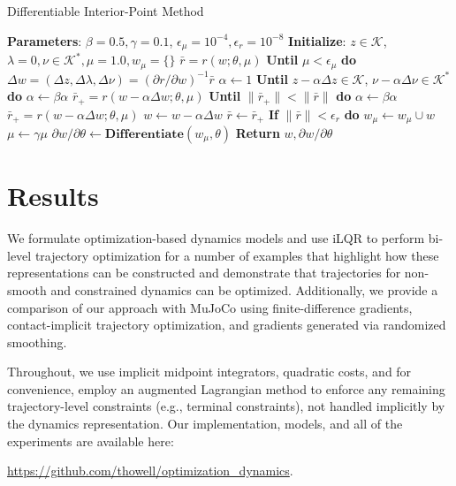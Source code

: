 \begin{algorithm}[H]
	\caption{Differentiable Interior-Point Method}\label{od_ip_algo}
	\begin{algorithmic}[1]
		\State \textbf{Parameters}: $\beta = 0.5, \gamma = 0.1$,
		\State \indent $\epsilon_{\mu} = 10^{-4}, \epsilon_{r} = 10^{-8}$
		\State \textbf{Initialize}: $z \in \mathcal{K}$, $\lambda = 0, \nu \in \mathcal{K}^*, \mu = 1.0, w_{\mu} = \{\}$
		\State $\bar{r} = r(w; \theta, \mu)$
		\State \textbf{Until} $\mu < \epsilon_{\mu}$ \textbf{do}
		\State \indent $\Delta w = (\Delta z, \Delta \lambda, \Delta \nu) = (\partial r / \partial w)^{-1} \bar{r}$
		\State \indent $\alpha \leftarrow 1$
		\State \indent \textbf{Until} $z - \alpha \Delta z \in \mathcal{K}$, $\nu - \alpha \Delta \nu \in \mathcal{K}^*$ \textbf{do}
		\State \indent \indent $\alpha \leftarrow \beta \alpha$
		\State \indent $\bar{r}_{+} = r(w-\alpha\Delta w; \theta, \mu)$
		\State \indent \textbf{Until} $\|\bar{r}_{+}\| < \|\bar{r}\|$ \textbf{do}
		\State \indent \indent $\alpha \leftarrow \beta \alpha$
		\State \indent \indent $\bar{r}_{+} = r(w-\alpha\Delta w; \theta, \mu)$
		\State \indent $w \leftarrow w - \alpha \Delta w$
		\State \indent $\bar{r} \leftarrow \bar{r}_{+}$
		\State \indent \textbf{If} $\|\bar{r}\| < \epsilon_{r}$ \textbf{do}
		\State \indent \indent $w_{\mu} \leftarrow w_{\mu} \cup w$
		\State \indent \indent $\mu \leftarrow \gamma \mu$
		\State $\partial w / \partial \theta \leftarrow \textbf{Differentiate}(w_{\mu}, \theta)$ 
		\State \textbf{Return} $w, \partial w / \partial \theta$
		\EndProcedure
	\end{algorithmic}
\end{algorithm}

\section{Results}\label{od_results}
We formulate optimization-based dynamics models and use iLQR to perform bi-level trajectory optimization for a number of examples that highlight how these representations can be constructed and demonstrate that trajectories for non-smooth and constrained dynamics can be optimized. Additionally, we provide a comparison of our approach with MuJoCo using finite-difference gradients, contact-implicit trajectory optimization, and gradients generated via randomized smoothing.

Throughout, we use implicit midpoint integrators, quadratic costs, and for convenience, employ an augmented Lagrangian method to enforce any remaining trajectory-level constraints (e.g., terminal constraints), not handled implicitly by the dynamics representation. Our implementation, models, and all of the experiments are available here:
\begin{center}
\url{https://github.com/thowell/optimization_dynamics}.
\end{center}


